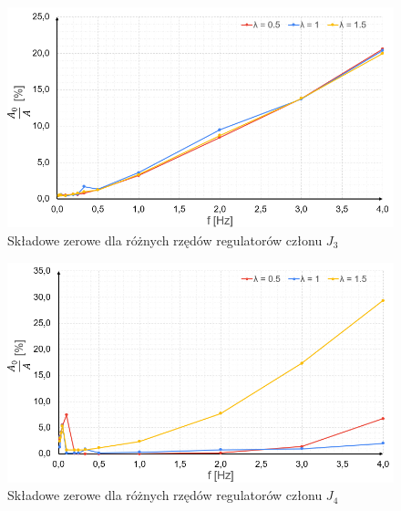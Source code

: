 \documentclass[journal,twoside,web]{ieeecolor}
\begin{document}
\begin{figure}[ht]
	\centering
	\includegraphics[width=1\linewidth]{../figs/4}
	\caption{Składowe zerowe dla różnych rzędów regulatorów członu $J_3$}
	\label{fig:4}
\end{figure}

\begin{figure}[ht]
	\centering
	\includegraphics[width=1\linewidth]{../figs/5}
	\caption{Składowe zerowe dla różnych rzędów regulatorów członu $J_4$}
	\label{fig:5}
\end{figure}


\clearpage
\end{document}
